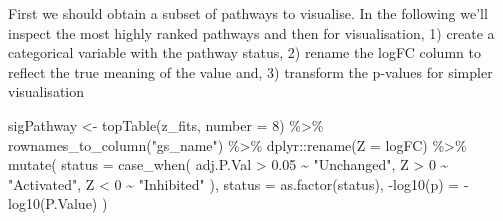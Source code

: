 \documentclass[9pt,a4paper,]{extarticle}
\newenvironment{Shaded}{\begin{snugshade}}{\end{snugshade}}
\newcommand{\AttributeTok}[1]{\textcolor[rgb]{0.77,0.63,0.00}{#1}}
\newcommand{\DecValTok}[1]{\textcolor[rgb]{0.00,0.00,0.81}{#1}}
\newcommand{\FloatTok}[1]{\textcolor[rgb]{0.00,0.00,0.81}{#1}}
\newcommand{\FunctionTok}[1]{\textcolor[rgb]{0.00,0.00,0.00}{#1}}
\newcommand{\NormalTok}[1]{#1}
\newcommand{\OtherTok}[1]{\textcolor[rgb]{0.56,0.35,0.01}{#1}}
\newcommand{\SpecialCharTok}[1]{\textcolor[rgb]{0.00,0.00,0.00}{#1}}
\newcommand{\StringTok}[1]{\textcolor[rgb]{0.31,0.60,0.02}{#1}}
\begin{document}
First we should obtain a subset of pathways to visualise.
In the following we'll inspect the most highly ranked pathways and then for visualisation, 1) create a categorical variable with the pathway status, 2) rename the logFC column to reflect the true meaning of the value and, 3) transform the p-values for simpler visualisation

\begin{Shaded}
\begin{Highlighting}[]
\NormalTok{sigPathway }\OtherTok{\textless{}{-}} \FunctionTok{topTable}\NormalTok{(z\_fits, }\AttributeTok{number =} \DecValTok{8}\NormalTok{) }\SpecialCharTok{\%\textgreater{}\%} 
  \FunctionTok{rownames\_to\_column}\NormalTok{(}\StringTok{"gs\_name"}\NormalTok{) }\SpecialCharTok{\%\textgreater{}\%} 
\NormalTok{  dplyr}\SpecialCharTok{::}\FunctionTok{rename}\NormalTok{(}\AttributeTok{Z =}\NormalTok{ logFC) }\SpecialCharTok{\%\textgreater{}\%} 
  \FunctionTok{mutate}\NormalTok{(}
    \AttributeTok{status =} \FunctionTok{case\_when}\NormalTok{(}
\NormalTok{      adj.P.Val }\SpecialCharTok{\textgreater{}} \FloatTok{0.05} \SpecialCharTok{\textasciitilde{}} \StringTok{"Unchanged"}\NormalTok{,}
\NormalTok{      Z }\SpecialCharTok{\textgreater{}} \DecValTok{0} \SpecialCharTok{\textasciitilde{}} \StringTok{"Activated"}\NormalTok{, }
\NormalTok{      Z }\SpecialCharTok{\textless{}} \DecValTok{0} \SpecialCharTok{\textasciitilde{}} \StringTok{"Inhibited"}
\NormalTok{    ),}
    \AttributeTok{status =} \FunctionTok{as.factor}\NormalTok{(status),}
    \StringTok{\textasciigrave{}}\AttributeTok{{-}log10(p)}\StringTok{\textasciigrave{}} \OtherTok{=} \SpecialCharTok{{-}}\FunctionTok{log10}\NormalTok{(P.Value)}
\NormalTok{  )}
\end{Highlighting}
\end{Shaded}
\end{document}

